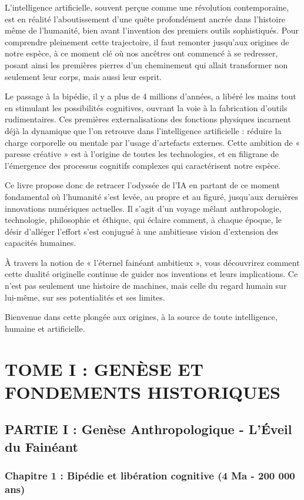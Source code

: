 \documentclass[12pt,a4paper]{book}
\begin{document}
L'intelligence artificielle, souvent perçue comme une révolution contemporaine, est en réalité l'aboutissement d'une quête profondément ancrée dans l'histoire même de l'humanité, bien avant l'invention des premiers outils sophistiqués. Pour comprendre pleinement cette trajectoire, il faut remonter jusqu'aux origines de notre espèce, à ce moment clé où nos ancêtres ont commencé à se redresser, posant ainsi les premières pierres d'un cheminement qui allait transformer non seulement leur corps, mais aussi leur esprit.

Le passage à la bipédie, il y a plus de 4 millions d'années, a libéré les mains tout en stimulant les possibilités cognitives, ouvrant la voie à la fabrication d'outils rudimentaires. Ces premières externalisations des fonctions physiques incarnent déjà la dynamique que l'on retrouve dans l'intelligence artificielle : réduire la charge corporelle ou mentale par l'usage d'artefacts externes. Cette ambition de « paresse créative » est à l'origine de toutes les technologies, et en filigrane de l'émergence des processus cognitifs complexes qui caractérisent notre espèce.

Ce livre propose donc de retracer l'odyssée de l'IA en partant de ce moment fondamental où l'humanité s'est levée, au propre et au figuré, jusqu'aux dernières innovations numériques actuelles. Il s'agit d'un voyage mêlant anthropologie, technologie, philosophie et éthique, qui éclaire comment, à chaque époque, le désir d'alléger l'effort s'est conjugué à une ambitieuse vision d'extension des capacités humaines.

À travers la notion de « l'éternel fainéant ambitieux », vous découvrirez comment cette dualité originelle continue de guider nos inventions et leurs implications. Ce n'est pas seulement une histoire de machines, mais celle du regard humain sur lui-même, sur ses potentialités et ses limites.

Bienvenue dans cette plongée aux origines, à la source de toute intelligence, humaine et artificielle.

\section{TOME I : GENÈSE ET FONDEMENTS HISTORIQUES}

\subsection{PARTIE I : Genèse Anthropologique - L'Éveil du Fainéant}

\subsubsection{Chapitre 1 : Bipédie et libération cognitive (4 Ma - 200 000 ans)}
\end{document}
